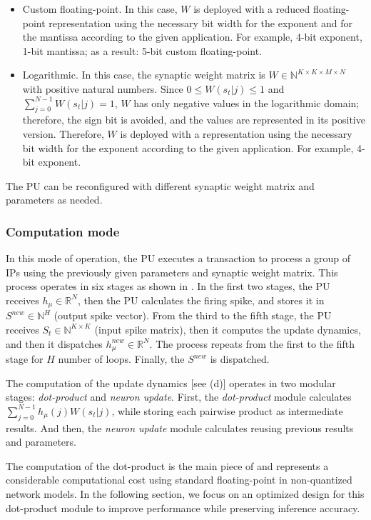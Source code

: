 \begin{itemize}
	\item{Custom floating-point}.
	In this case, $W$ is deployed with a reduced floating-point representation using the necessary bit width for the exponent and for the mantissa according to the given application. For example, 4-bit exponent, 1-bit mantissa; as a result: 5-bit custom floating-point.
	\item{Logarithmic}.
	In this case, the synaptic weight matrix is $W\in\mathbb{N}^{K\times K\times M\times N}$ with positive natural numbers. Since $0\le W(s_t|j)\le1$ and $\sum_{j=0}^{N-1}W(s_t|j)=1$, $W$ has only negative values in the logarithmic domain; therefore, the sign bit is avoided, and the values are represented in its positive version. Therefore, $W$ is deployed with a representation using the necessary bit width for the exponent according to the given application. For example, 4-bit exponent.
\end{itemize}

The PU can be reconfigured with different synaptic weight matrix and parameters as needed.

\subsubsection{Computation mode}
In this mode of operation, the PU executes a transaction to process a group of IPs using the previously given parameters and synaptic weight matrix. This process operates in six stages as shown in . In the first two stages, the PU receives $h_\mu\in\mathbb{R}^{N}$, then the PU calculates the firing spike, and stores it in $S^{new}\in\mathbb{N}^{H}$ (output spike vector). From the third to the fifth stage, the PU receives $S_t\in\mathbb{N}^{K\times K}$ (input spike matrix), then it computes the update dynamics, and then it dispatches $h_\mu^{new}\in\mathbb{R}^{N}$. The process repeats from the first to the fifth stage for $H$ number of loops. Finally, the $S^{new}$ is dispatched.

The computation of the update dynamics [see (d)] operates in two modular stages: \emph{dot-product} and \emph{neuron update}. First, the \emph{dot-product} module calculates $\sum_{j=0}^{N-1}h_{\mu}(j)W(s_t|j)$, while storing each pairwise product as intermediate results. And then, the \emph{neuron update} module calculates  reusing previous results and parameters.


The computation of the dot-product is the main piece of  and represents a considerable computational cost using standard floating-point in non-quantized network models. In the following section, we focus on an optimized design for this dot-product module to improve performance while preserving inference accuracy.

